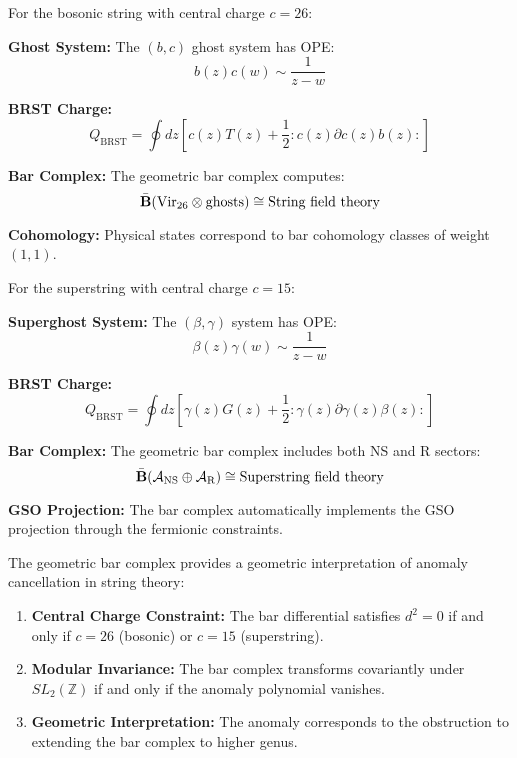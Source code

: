 \begin{example}
For the bosonic string with central charge $c = 26$:

\textbf{Ghost System:} The $(b,c)$ ghost system has OPE:
$$b(z)c(w) \sim \frac{1}{z-w}$$

\textbf{BRST Charge:} 
$$Q_{\text{BRST}} = \oint dz \left[ c(z)T(z) + \frac{1}{2}:c(z)\partial c(z)b(z): \right]$$

\textbf{Bar Complex:} The geometric bar complex computes:
$$\bar{\mathbf{B}}(\text{Vir}_{26} \otimes \text{ghosts}) \cong \text{String field theory}$$

\textbf{Cohomology:} Physical states correspond to bar cohomology classes of weight $(1,1)$.
\end{example}

\begin{example}
For the superstring with central charge $c = 15$:

\textbf{Superghost System:} The $(\beta,\gamma)$ system has OPE:
$$\beta(z)\gamma(w) \sim \frac{1}{z-w}$$

\textbf{BRST Charge:}
$$Q_{\text{BRST}} = \oint dz \left[ \gamma(z)G(z) + \frac{1}{2}:\gamma(z)\partial\gamma(z)\beta(z): \right]$$

\textbf{Bar Complex:} The geometric bar complex includes both NS and R sectors:
$$\bar{\mathbf{B}}(\mathcal{A}_{\text{NS}} \oplus \mathcal{A}_{\text{R}}) \cong \text{Superstring field theory}$$

\textbf{GSO Projection:} The bar complex automatically implements the GSO projection through the fermionic constraints.
\end{example}

\begin{theorem}\label{thm:anomaly-cancellation}
The geometric bar complex provides a geometric interpretation of anomaly cancellation in string theory:

\begin{enumerate}
\item \textbf{Central Charge Constraint:} The bar differential satisfies $d^2 = 0$ if and only if $c = 26$ (bosonic) or $c = 15$ (superstring).

\item \textbf{Modular Invariance:} The bar complex transforms covariantly under $SL_2(\mathbb{Z})$ if and only if the anomaly polynomial vanishes.

\item \textbf{Geometric Interpretation:} The anomaly corresponds to the obstruction to extending the bar complex to higher genus.
\end{enumerate}
\end{theorem}

